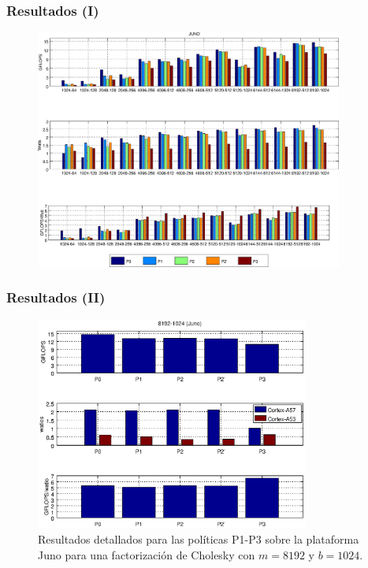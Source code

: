 \documentclass[10pt]{beamer}
\begin{document}
\begin{frame}[shrink]
  \frametitle{Resultados (I)}
  \begin{figure}
    \centering
    \includegraphics[width=0.9\textwidth]{Plots/dvfs_results/0-4_all_juno.eps}
  \end{figure}
\end{frame}

\begin{frame}
  \frametitle{Resultados (II)}
  \begin{figure}
    \centering
    \includegraphics[width=0.8\textwidth]{Plots/dvfs_results/8192-124_0-4_juno.eps}
    \caption{Resultados detallados para las políticas P1-P3 sobre la
      plataforma {\sc Juno} para una factorización de Cholesky con
      $m=8192$ y $b=1024$.}
  \end{figure}
\end{frame}
\end{document}
